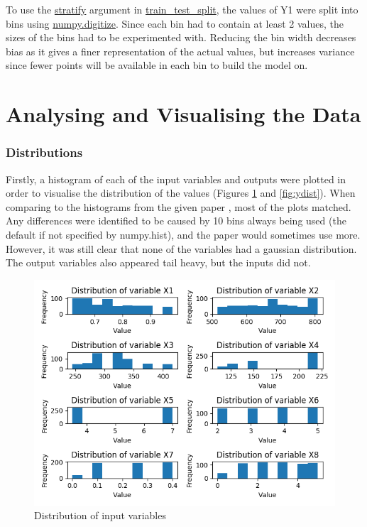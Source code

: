 \documentclass[12pt]{article}
\begin{document}
To use the \url{stratify} argument in \url{train_test_split}, the values of Y1 were split into bins using \url{numpy.digitize}. Since each bin had to contain at least 2 values, the sizes of the bins had to be experimented with. Reducing the bin width decreases bias as it gives a finer representation of the actual values, but increases variance since fewer points will be available in each bin to build the model on.

\part{Analysing and Visualising the Data}

\section{Distributions}

Firstly, a histogram of each of the input variables and outputs were plotted in order to visualise the distribution of the values (Figures \ref{fig:xdist} and \ref{fig:ydist}). When comparing to the histograms from the given paper \cite{tsanas_xifara_2012}, most of the plots matched. Any differences were identified to be caused by 10 bins always being used (the default if not specified by numpy.hist), and the paper would sometimes use more. However, it was still clear that none of the variables had a gaussian distribution. The output variables also appeared tail heavy, but the inputs did not.

\begin{figure}[!ht]
\centering
\includegraphics[width=0.8 \linewidth]{images/XDist}
\caption{Distribution of input variables}
\label{fig:xdist}
\end{figure}
\end{document}
